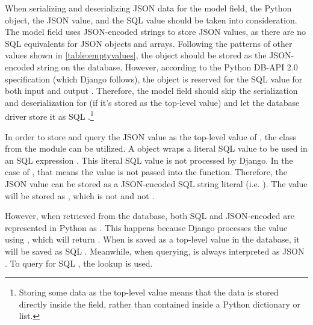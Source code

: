When serializing and deserializing JSON data for the model field, the Python
 object, the JSON  value, and the SQL  value
should be taken into consideration. The model field uses JSON-encoded strings
to store JSON values, as there are no SQL equivalents for JSON objects and
arrays. Following the patterns of other values shown in
\autoref{table:emptyvalues}, the  object should be stored as the
JSON-encoded  string on the database. However, according to the
Python DB-API 2.0 specification (which Django follows), the  object
is reserved for the SQL  value for both input and output
\cite{db-api2}. Therefore, the model field should skip the serialization and
deserialization for  (if it's stored as the top-level value) and let
the database driver store it as SQL .\footnote{Storing some data as
the top-level value means that the data is stored directly inside the field,
rather than contained inside a Python dictionary or list.}

In order to store and query the JSON  value as the top-level value
of , the  class from the 
module can be utilized. A  object wraps a literal SQL value to be
used in an SQL expression \cite{django:value}. This literal SQL value is not
processed by Django. In the case of , that means the value is
not passed into the  function. Therefore, the JSON
 value can be stored as a JSON-encoded SQL string literal (i.e.
). The value will be stored as , which is
not  and not .

However, when retrieved from the database, both SQL  and
JSON-encoded  are represented in Python as . This
happens because Django processes the  value using
, which will return . When  is saved
as a top-level value in the database, it will be saved as SQL .
Meanwhile, when querying,  is always interpreted as JSON
. To query for SQL , the  lookup is used.

\noindent
\begin{minipage}{\linewidth}

\end{minipage}

